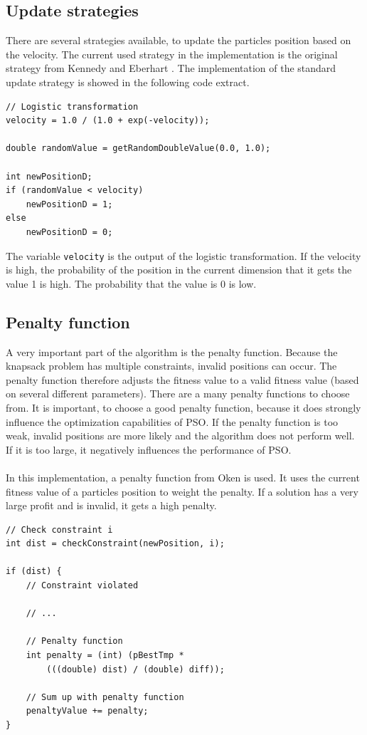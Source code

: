 \documentclass{article}
\begin{document}
\subsection{Update strategies}
There are several strategies available, to update the particles position based on the velocity. The current used strategy in the implementation is the original strategy from Kennedy and Eberhart \cite{bib-discrete}. The implementation of the standard update strategy is showed in the following code extract.\\

\begin{lstlisting}[caption="UpdateStrategy.cpp"]
// Logistic transformation
velocity = 1.0 / (1.0 + exp(-velocity));

double randomValue = getRandomDoubleValue(0.0, 1.0);

int newPositionD;
if (randomValue < velocity)
    newPositionD = 1;
else
    newPositionD = 0;
\end{lstlisting}

The variable \lstinline{velocity} is the output of the logistic transformation. If the velocity is high, the probability of the position in the current dimension that it gets the value 1 is high. The probability that the value is 0 is low.

\subsection{Penalty function}
A very important part of the algorithm is the penalty function. Because the knapsack problem has multiple constraints, invalid positions can occur. The penalty function therefore adjusts the fitness value to a valid fitness value (based on several different parameters). There are a many penalty functions to choose from. It is important, to choose a good penalty function, because it does strongly influence the optimization capabilities of PSO. If the penalty function is too weak, invalid positions are more likely and the algorithm does not perform well. If it is too large, it negatively influences the performance of PSO.\\ \\
In this implementation, a penalty function from Oken \cite{bib-penalty} is used. It uses the current fitness value of a particles position to weight the penalty. If a solution has a very large profit and is invalid, it gets a high penalty.\\

\begin{lstlisting}[caption="Solver.cpp"]
// Check constraint i
int dist = checkConstraint(newPosition, i);

if (dist) {
	// Constraint violated
	
	// ...
	
	// Penalty function
	int penalty = (int) (pBestTmp *
		(((double) dist) / (double) diff));
		
	// Sum up with penalty function
	penaltyValue += penalty;
}
\end{lstlisting}
\end{document}

